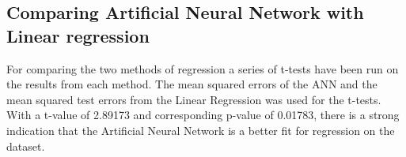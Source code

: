 \subsection{Comparing Artificial Neural Network with Linear regression}
For comparing the two methods of regression a series of t-tests have been run on the results from each method. The mean squared errors of the ANN and the mean squared test errors from the Linear Regression was used for the t-tests. With a t-value of 2.89173 and corresponding p-value of 0.01783, there is a strong indication that the Artificial Neural Network is a better fit for regression on the dataset.